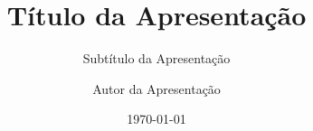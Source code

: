 

\title{Título da Apresentação}
\subtitle{Subtítulo da Apresentação}
\author{Autor da Apresentação}
\date{\today}
\subject{Assunto}

\newcommand{\source}[1]{\caption*{\textbf{Fonte:} {#1}}}     %